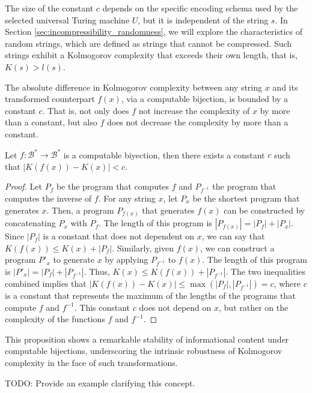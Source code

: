 The size of the constant $c$ depends on the specific encoding schema used by the selected universal Turing machine $U$, but it is independent of the string $s$. In Section \ref{sec:incompressibility_randomness}, we will explore the characteristics of random strings, which are defined as strings that cannot be compressed. Such strings exhibit a Kolmogorov complexity that exceeds their own length, that is, $K(s) > l(s)$.

The absolute difference in Kolmogorov complexity between any string \(x\) and its transformed counterpart \(f(x)\), via a computable bijection, is bounded by a constant $c$. That is, not only does $f$ not increase the complexity of $x$ by more than a constant, but also $f$ does not decrease the complexity by more than a constant.

\begin{proposition}
Let $f:\mathcal{B}^{\ast} \to \mathcal{B}^{\ast}$ is a computable biyection, then there exists a constant $c$ such that $| K\left( f(x) \right) -  K(x) | < c$.
\end{proposition}
\begin{proof}
Let $P_f$ be the program that computes $f$ and $P_{f^{-1}}$ the program that computes the inverse of $f$. For any string $x$, let $P_x$ be the shortest program that generates $x$. Then, a program $P_{f(x)}$ that generates $f(x)$ can be constructed by concatenating $P_x$ with $P_f$. The length of this program is $|P_{f(x)}| = |P_f| + |P_x|$. Since $|P_f|$ is a constant that does not dependent on $x$, we can say that $K(f(x)) \leq K(x) + |P_f|$. Similarly, given $f(x)$, we can construct a program $P'_{x}$ to generate $x$ by applying $P_{f^{-1}}$ to $f(x)$. The length of this program is $|P'_{x}| = |P_f| + |P_{f^{-1}}|$. Thus, $K(x) \leq K(f(x)) + |P_{f^{-1}}|$. The two inequalities combined implies that $|K(f(x)) - K(x)| \leq \max(|P_f|, |P_{f^{-1}}|) = c$, where \(c\) is a constant that represents the maximum of the lengths of the programs that compute \(f\) and \(f^{-1}\). This constant \(c\) does not depend on \(x\), but rather on the complexity of the functions \(f\) and \(f^{-1}\).
\end{proof}

This proposition shows a remarkable stability of informational content under computable bijections, underscoring the intrinsic robustness of Kolmogorov complexity in the face of such transformations.

\begin{example}
{\color{red} TODO: Provide an example clarifying this concept.}
\end{example}

